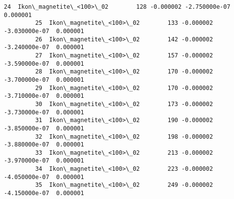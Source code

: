 \documentclass{article}
\begin{document}
\begin{Verbatim}[commandchars=\\\{\}]
         24  Ikon\_magnetite\_<100>\_02        128 -0.000002 -2.750000e-07  0.000001   
         25  Ikon\_magnetite\_<100>\_02        133 -0.000002 -3.030000e-07  0.000001   
         26  Ikon\_magnetite\_<100>\_02        142 -0.000002 -3.240000e-07  0.000001   
         27  Ikon\_magnetite\_<100>\_02        157 -0.000002 -3.590000e-07  0.000001   
         28  Ikon\_magnetite\_<100>\_02        170 -0.000002 -3.700000e-07  0.000001   
         29  Ikon\_magnetite\_<100>\_02        170 -0.000002 -3.710000e-07  0.000001   
         30  Ikon\_magnetite\_<100>\_02        173 -0.000002 -3.730000e-07  0.000001   
         31  Ikon\_magnetite\_<100>\_02        190 -0.000002 -3.850000e-07  0.000001   
         32  Ikon\_magnetite\_<100>\_02        198 -0.000002 -3.880000e-07  0.000001   
         33  Ikon\_magnetite\_<100>\_02        213 -0.000002 -3.970000e-07  0.000001   
         34  Ikon\_magnetite\_<100>\_02        223 -0.000002 -4.050000e-07  0.000001   
         35  Ikon\_magnetite\_<100>\_02        249 -0.000002 -4.150000e-07  0.000001   
         

\end{Verbatim}
\end{document}

